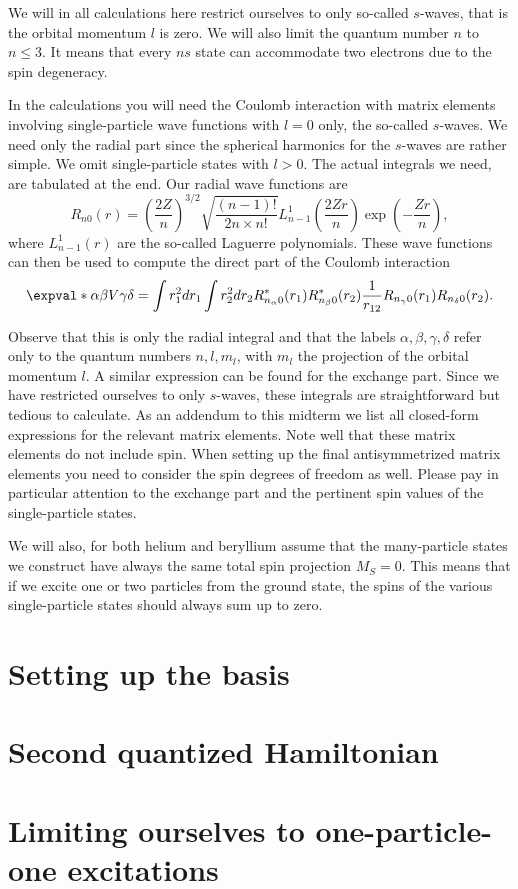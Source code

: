 \documentclass{article}
\begin{document}
We will in all calculations here restrict ourselves to only so-called \(s\)-waves, that is the orbital momentum \(l\) is zero.
We will also limit the quantum number \(n\) to \(n \le 3\).
It means that every \(ns\) state can accommodate two electrons due to the spin degeneracy.

In the calculations you will need the Coulomb interaction with matrix elements involving single-particle wave functions with \(l = 0\) only, the
so-called \(s\)-waves.
We need only the radial part since the spherical harmonics for the \(s\)-waves are rather simple.
We omit single-particle states with \(l > 0\).
The actual integrals we need, are tabulated at the end.
Our radial wave functions are
\begin{equation*}
    R_{n0}(r) = \left( \frac{2Z}{n} \right)^{3/2} \sqrt{\frac{(n-1)!}{2n\times n!}} L_{n-1}^1 \left( \frac{2Zr}{n} \right) \exp{\left( -\frac{Zr}{n} \right)},
\end{equation*}
where \(L_{n-1}^1(r)\) are the so-called Laguerre polynomials.
These wave functions can then be used to compute the direct part of the Coulomb interaction
\begin{equation*}
    \expval*{\alpha\beta}{V}{\gamma\delta} = \int r_1^2 dr_1 \int r_2^2 dr_2 R_{n_{\alpha} 0}^*(r_1) R_{n_{\beta} 0}^*(r_2) \frac{1}{r_{12}}R_{n_{\gamma} 0}(r_1) R_{n_{\delta} 0}(r_2).
\end{equation*}

Observe that this is only the radial integral and that the labels \( \alpha,\beta,\gamma,\delta \) refer only to the quantum numbers \(n,l,m_l\), with \(m_l\) the projection of the orbital momentum \(l\).
A similar expression can be found for the exchange part.
Since we have restricted ourselves to only \(s\)-waves, these integrals are straightforward but tedious to calculate.
As an addendum to this midterm we list all closed-form expressions for the relevant matrix elements.
Note well that these matrix elements do not include spin.
When setting up the final antisymmetrized matrix elements you need to consider the spin degrees of freedom as well.
Please pay in particular attention to the exchange part and the pertinent spin values of the single-particle states.

We will also, for both helium and beryllium assume that the many-particle states we construct have always the same total spin projection \(M_S = 0\).
This means that if we excite one or two particles from the ground state, the spins of the various single-particle states should always sum up to zero.

\section{Setting up the basis}


\section{Second quantized Hamiltonian}


\section{Limiting ourselves to one-particle-one excitations}

\end{document}
